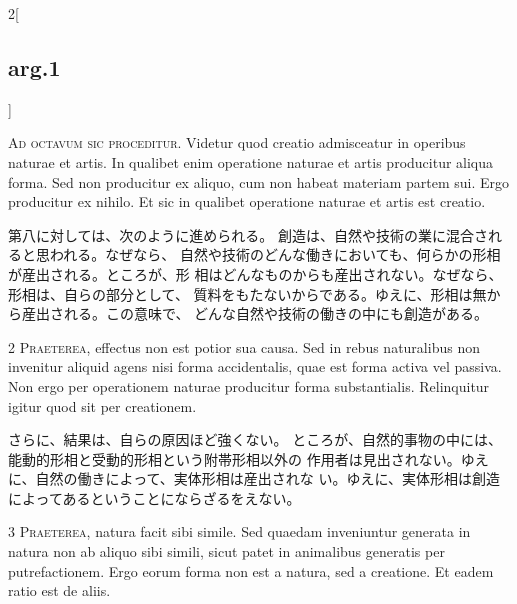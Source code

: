 \documentclass[paper=a4paper,fontsize=10pt,jafontsize=9pt,titlepage]{jlreq}
\begin{document}
\begin{paracol}{2}[\subsection{arg.1}]

{\huge A}{\scshape d octavum sic proceditur}. Videtur quod
creatio admisceatur in operibus naturae et artis. In qualibet enim
operatione naturae et artis producitur aliqua forma. Sed non producitur
ex aliquo, cum non habeat materiam partem sui. Ergo producitur ex
nihilo. Et sic in qualibet operatione naturae et artis est creatio.

\switchcolumn

第八に対しては、次のように進められる。
創造は、自然や技術の業に混合されると思われる。なぜなら、
自然や技術のどんな働きにおいても、何らかの形相が産出される。ところが、形
 相はどんなものからも産出されない。なぜなら、形相は、自らの部分として、
 質料をもたないからである。ゆえに、形相は無から産出される。この意味で、
 どんな自然や技術の働きの中にも創造がある。


{\scshape 2 Praeterea}, effectus non est potior sua
causa. Sed in rebus naturalibus non invenitur aliquid agens nisi forma
accidentalis, quae est forma activa vel passiva. Non ergo per
operationem naturae producitur forma substantialis. Relinquitur igitur
quod sit per creationem.

\switchcolumn

さらに、結果は、自らの原因ほど強くない。
ところが、自然的事物の中には、能動的形相と受動的形相という附帯形相以外の
 作用者は見出されない。ゆえに、自然の働きによって、実体形相は産出されな
 い。ゆえに、実体形相は創造によってあるということにならざるをえない。


{\scshape 3 Praeterea}, natura facit sibi simile. Sed
quaedam inveniuntur generata in natura non ab aliquo sibi simili, sicut
patet in animalibus generatis per putrefactionem. Ergo eorum forma non
est a natura, sed a creatione. Et eadem ratio est de aliis.

\switchcolumn


\end{paracol}
\end{document}
